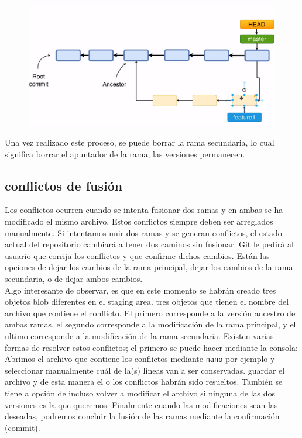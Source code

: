 \begin{figure}[H]
    \centering
    \includegraphics[scale=0.3]{Github/Git_f8.png}
\end{figure}
Una vez realizado este proceso, se puede borrar la rama secundaria, lo cual significa borrar el apuntador de la rama, las versiones permanecen. 

\subsection{conflictos de fusión}

Los conflictos ocurren cuando se intenta fusionar dos ramas y en ambas se ha modificado el mismo archivo. Estos conflictos siempre deben ser arreglados manualmente. Si intentamos unir dos ramas y se generan conflictos, el estado actual del repositorio cambiará a tener dos caminos sin fusionar. Git le pedirá al usuario que corrija los conflictos y que confirme dichos cambios. Están las opciones de dejar los cambios de la rama principal, dejar los cambios de la rama secundaria, o de dejar ambos cambios. \\

Algo interesante de observar, es que en este momento se habrán creado tres objetos blob diferentes en el staging area. tres objetos que tienen el nombre del archivo que contiene el conflicto. El primero corresponde a la versión ancestro de ambas ramas, el segundo corresponde a la modificación de la rama principal, y el ultimo corresponde a la modificación de la rama secundaria. Existen varias formas de resolver estos conflictos; el primero se puede hacer mediante la consola: \\

Abrimos el archivo que contiene los conflictos mediante \texttt{nano} por ejemplo y seleccionar manualmente cuál de la(s) líneas van a ser conservadas. guardar el archivo y de esta manera el o los conflictos habrán sido resueltos. También se tiene a opción de incluso volver a modificar el archivo si ninguna de las dos versiones es la que queremos. Finalmente cuando las modificaciones sean las deseadas, podremos concluir la fusión de las ramas mediante la confirmación (commit). 

